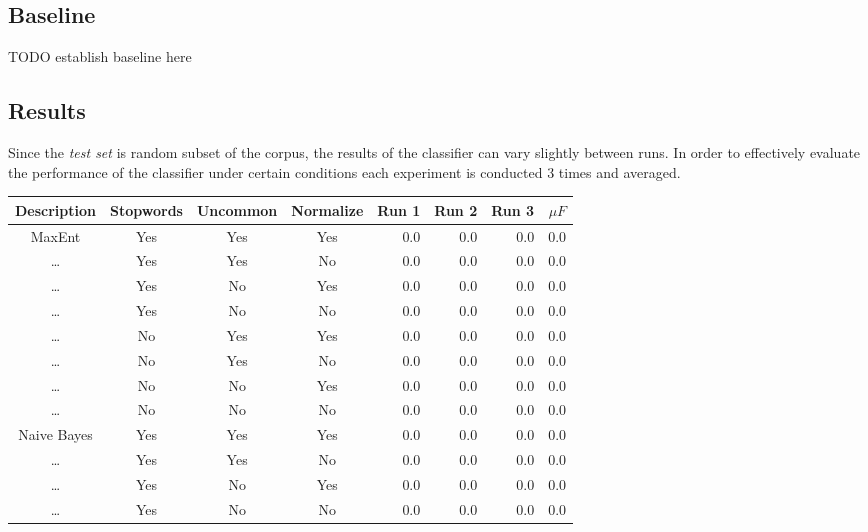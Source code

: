\documentclass[12pt]{article}
\begin{document}
\subsection{Baseline}

TODO establish baseline here

\subsection{Results}

Since the \textit{test set} is random subset of the corpus, the results of the
classifier can vary slightly between runs. In order to effectively evaluate the
performance of the classifier under certain conditions each experiment is
conducted 3 times and averaged.

\begin{table}[H]
    \begin{center}
    \begin{tabular}{|c|c|c|c|r|r|r|r|}
        \hline
        Description & Stopwords & Uncommon  & Normalize & Run 1 & Run 2 & Run 3 & $\mu F$\\
        \hline
        MaxEnt      & Yes       & Yes       & Yes       & 0.0   & 0.0   & 0.0   & 0.0 \\
        \dots       & Yes       & Yes       & No        & 0.0   & 0.0   & 0.0   & 0.0 \\
        \dots       & Yes       & No        & Yes       & 0.0   & 0.0   & 0.0   & 0.0 \\
        \dots       & Yes       & No        & No        & 0.0   & 0.0   & 0.0   & 0.0 \\
        \dots       & No        & Yes       & Yes       & 0.0   & 0.0   & 0.0   & 0.0 \\
        \dots       & No        & Yes       & No        & 0.0   & 0.0   & 0.0   & 0.0 \\
        \dots       & No        & No        & Yes       & 0.0   & 0.0   & 0.0   & 0.0 \\
        \dots       & No        & No        & No        & 0.0   & 0.0   & 0.0   & 0.0 \\
        Naive Bayes & Yes       & Yes       & Yes       & 0.0   & 0.0   & 0.0   & 0.0 \\
        \dots       & Yes       & Yes       & No        & 0.0   & 0.0   & 0.0   & 0.0 \\
        \dots       & Yes       & No        & Yes       & 0.0   & 0.0   & 0.0   & 0.0 \\
        \dots       & Yes       & No        & No        & 0.0   & 0.0   & 0.0   & 0.0 \\

\end{tabular}
\end{center}
\end{table}
\end{document}

